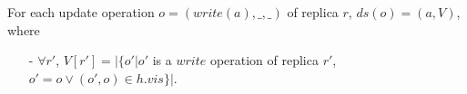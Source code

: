 \begin{example}
\label{example:virtual messages of state-based multi-value register}

For each update operation $o = (\mathit{write}(a),\_,\_)$ of replica $r$, $\mathit{ds}(o) = (a,V)$, where

\begin{itemize}
\setlength{\itemsep}{0.5pt}
\item[-] $\forall r'$, $V[r'] = \vert \{ o' \vert o'$ is a $\mathit{write}$ operation of replica $r'$, $o' = o \vee (o',o) \in h.\mathit{vis} \} \vert$.
\end{itemize}
\end{example}









